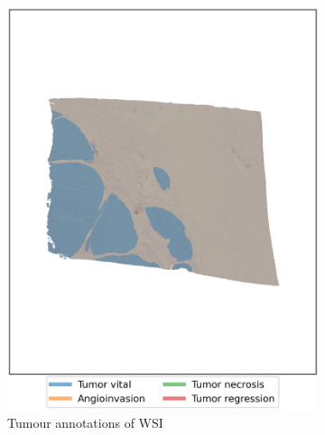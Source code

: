 \begin{figure}[h!t]
    \centering
     \begin{subfigure}[b]{0.475\textwidth}
         \centering
         \includegraphics[width=\textwidth]{latex/captum/case13b/masks_case13-stain42-dead_2415days.png}
         \caption{Tumour annotations of WSI}
     \end{subfigure}
    \hfill
     \begin{subfigure}[b]{0.49\textwidth}
         \centering

\end{subfigure}
\end{figure}
